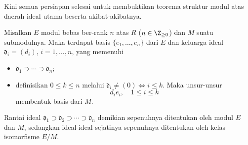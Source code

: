 Kini semua persiapan selesai untuk membuktikan teorema struktur modul atas daerah ideal utama beserta akibat-akibatnya.
\begin{theorem}\label{prop:elementary-divisor-sub}
	Misalkan $E$ modul bebas ber-rank $n$ atas $R$ ($n \in \Z_{\geq 0}$) dan $M$ suatu submodulnya. Maka terdapat basis $\{e_1, \ldots, e_n\}$ dari $E$ dan keluarga ideal $\mathfrak{d}_i = (d_i)$, $i=1, \ldots, n$, yang memenuhi
	\begin{itemize}
		\item $\mathfrak{d}_1 \supset \cdots \supset \mathfrak{d}_n$;
		\item definisikan $0 \leq k \leq n$ melalui $\mathfrak{d}_i \neq (0) \iff i \leq k$. Maka unsur-unsur
			\[ d_i e_i, \quad 1 \leq i \leq k \]
		membentuk basis dari $M$.
	\end{itemize}
	Rantai ideal $\mathfrak{d}_1 \supset \mathfrak{d}_2 \supset \cdots \supset \mathfrak{d}_n$ demikian sepenuhnya ditentukan oleh modul $E$ dan $M$, sedangkan ideal-ideal sejatinya sepenuhnya ditentukan oleh kelas isomorfisme $E/M$.
\end{theorem}
